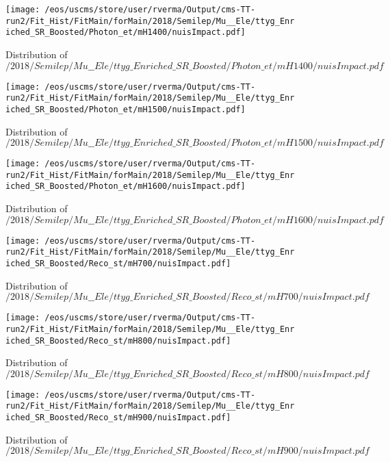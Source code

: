 \begin{figure}
\centering
\texttt{[image: /eos/uscms/store/user/rverma/Output/cms-TT-run2/Fit\_Hist/FitMain/forMain/2018/Semilep/Mu\_\_Ele/ttyg\_Enriched\_SR\_Boosted/Photon\_et/mH1400/nuisImpact.pdf]}
\caption{Distribution of $/2018/Semilep/Mu\_\_Ele/ttyg\_Enriched\_SR\_Boosted/Photon\_et/mH1400/nuisImpact.pdf$}
\end{figure}

\begin{figure}
\centering
\texttt{[image: /eos/uscms/store/user/rverma/Output/cms-TT-run2/Fit\_Hist/FitMain/forMain/2018/Semilep/Mu\_\_Ele/ttyg\_Enriched\_SR\_Boosted/Photon\_et/mH1500/nuisImpact.pdf]}
\caption{Distribution of $/2018/Semilep/Mu\_\_Ele/ttyg\_Enriched\_SR\_Boosted/Photon\_et/mH1500/nuisImpact.pdf$}
\end{figure}

\begin{figure}
\centering
\texttt{[image: /eos/uscms/store/user/rverma/Output/cms-TT-run2/Fit\_Hist/FitMain/forMain/2018/Semilep/Mu\_\_Ele/ttyg\_Enriched\_SR\_Boosted/Photon\_et/mH1600/nuisImpact.pdf]}
\caption{Distribution of $/2018/Semilep/Mu\_\_Ele/ttyg\_Enriched\_SR\_Boosted/Photon\_et/mH1600/nuisImpact.pdf$}
\end{figure}

\begin{figure}
\centering
\texttt{[image: /eos/uscms/store/user/rverma/Output/cms-TT-run2/Fit\_Hist/FitMain/forMain/2018/Semilep/Mu\_\_Ele/ttyg\_Enriched\_SR\_Boosted/Reco\_st/mH700/nuisImpact.pdf]}
\caption{Distribution of $/2018/Semilep/Mu\_\_Ele/ttyg\_Enriched\_SR\_Boosted/Reco\_st/mH700/nuisImpact.pdf$}
\end{figure}

\begin{figure}
\centering
\texttt{[image: /eos/uscms/store/user/rverma/Output/cms-TT-run2/Fit\_Hist/FitMain/forMain/2018/Semilep/Mu\_\_Ele/ttyg\_Enriched\_SR\_Boosted/Reco\_st/mH800/nuisImpact.pdf]}
\caption{Distribution of $/2018/Semilep/Mu\_\_Ele/ttyg\_Enriched\_SR\_Boosted/Reco\_st/mH800/nuisImpact.pdf$}
\end{figure}

\begin{figure}
\centering
\texttt{[image: /eos/uscms/store/user/rverma/Output/cms-TT-run2/Fit\_Hist/FitMain/forMain/2018/Semilep/Mu\_\_Ele/ttyg\_Enriched\_SR\_Boosted/Reco\_st/mH900/nuisImpact.pdf]}
\caption{Distribution of $/2018/Semilep/Mu\_\_Ele/ttyg\_Enriched\_SR\_Boosted/Reco\_st/mH900/nuisImpact.pdf$}
\end{figure}

